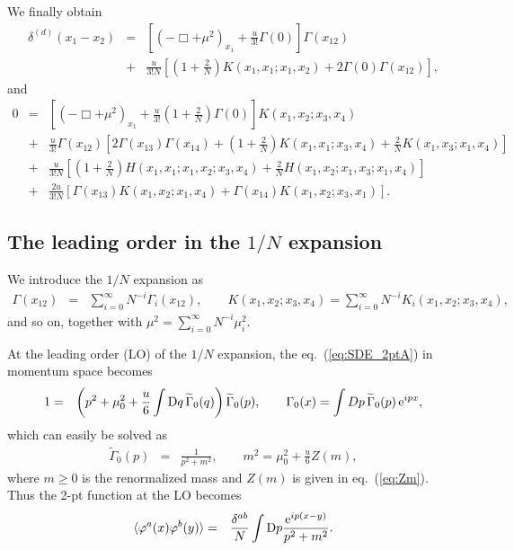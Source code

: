 \documentclass[preprint]{ptephy_v1}%
\newcommand{\rme}{{\rm e}}
\newcommand{\rmD}{{\rm D}}
\begin{document}
We finally obtain
\begin{eqnarray}
\delta^{(d)}(x_1-x_2) &=&  \left[ (- \Box +\mu^2)_{x_1} +\frac{u}{3!} \Gamma(0)\right] \Gamma(x_{12})\nonumber \\
&+& \frac{u}{3! N}\left[\left(1+\frac{2}{N}\right) K(x_1,x_1;x_1,x_2) +  2\Gamma(0)\Gamma(x_{12})\right] ,
\label{eq:SDE_2ptA}
\end{eqnarray}
and
\begin{eqnarray}
0&=&  \left[ (- \Box +\mu^2)_{x_1} +\frac{u}{3!}\left(1+\frac{2}{N}\right)\Gamma(0)\right] K(x_1,x_2;x_3,x_4)
\nonumber \\
&+& 
\frac{ u}{3! }\Gamma(x_{12}) \left[ 
2 \Gamma(x_{13})\Gamma(x_{14}) +\left(1+\frac{2}{N}\right) K(x_1,x_1;x_3,x_4)
+\frac{2}{N}K(x_1,x_3;x_1,x_4)\right]
\nonumber \\
&+& \frac{u}{3! N}\left[\left(1+\frac{2}{N}\right) H(x_1,x_1;x_1,x_2;x_3,x_4) +  \frac{2}{N}H(x_1,x_2;x_1,x_3;x_1,x_4)\right]\nonumber\\
&+&  \frac{2u}{3! N}
\left[  \Gamma(x_{13})K(x_1,x_2;x_1,x_4)+ \Gamma(x_{14})K(x_1,x_2;x_3,x_1) \right] .~~~~~
\label{eq:SDE_4ptA}
\end{eqnarray}

\subsection{The leading order in the $1/N$ expansion}
We introduce the $1/N$ expansion as
\begin{eqnarray}
\Gamma(x_{12}) &=&\sum_{i=0}^\infty N^{-i} \Gamma_i(x_{12}), \qquad
K(x_1,x_2;x_3,x_4) = \sum_{i=0}^\infty N^{-i} K_i(x_1,x_2;x_3,x_4), 
\end{eqnarray}
and so on, together with $\displaystyle \mu^2 =\sum_{i=0}^\infty N^{-i} \mu^2_i $.

At  the leading order (LO) of the $1/N$ expansion,
the eq.~(\ref{eq:SDE_2ptA}) in momentum space becomes  
\begin{eqnarray} 
1 &=& \left( p^2+\mu^2_0 +\frac{u}{6}  \int \rmD q\,  \widetilde{\Gamma}_0(q) \right)   \widetilde{\Gamma}_0(p) ,
\qquad   \Gamma_0(x) =\int Dp\, \widetilde{\Gamma}_0(p)\, \rme^{ipx}, 
\end{eqnarray}
which can easily be solved as
\begin{eqnarray} 
  \widetilde{\Gamma}_0(p) &=&\frac{1}{p^2+m^2}, \qquad m^2 = \mu^2_0 + \frac{u}{6} Z(m), 
 \label{eq:sol_2pt}
\end{eqnarray}
where $m \ge 0$ is the renormalized mass  and $Z(m)$ is given in eq.~(\ref{eq:Zm}). 
Thus the 2-pt function at the LO becomes
\begin{eqnarray}
\langle \varphi^a(x) \varphi^b(y)\rangle &=& \frac{\delta^{ab}}{N}\int \rmD p \frac{\rme^{ip(x-y)}}{p^2+m^2} .
\end{eqnarray}
\end{document}
